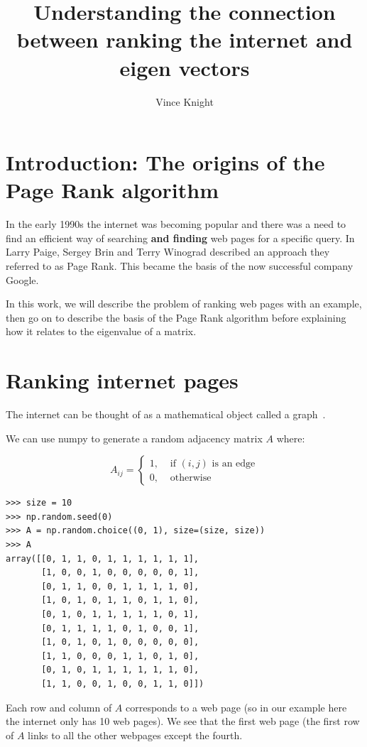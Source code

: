 \documentclass[a4paper]{article}
\title{Understanding the connection between
       ranking the internet and eigen vectors}
\author{Vince Knight}
\date{}
\begin{document}
\maketitle

\section{Introduction: The origins of the Page Rank algorithm}

In the early 1990s the internet was becoming popular and there was a need to
find an efficient way of searching \textbf{and finding} web pages for a specific
query. In~\cite{page1999pagerank} Larry Paige, Sergey Brin and Terry Winograd
described an approach they referred to as Page Rank. This became the basis of
the now successful company Google.

In this work, we will describe the problem of ranking web pages with an example,
then go on to describe the basis of the Page Rank algorithm before explaining
how it relates to the eigenvalue of a matrix.

\section{Ranking internet pages}\label{sec:ranking_pages}

The internet can be thought of as a mathematical object called a
graph~\cite{diestel2005graph}.

We can use numpy to generate a random adjacency matrix \(A\) where:

\[
    A_{ij}
    =
    \begin{cases}
        1,&\text{ if }(i,j) \text{ is an edge}\\
        0,&\text{ otherwise}
    \end{cases}
\]

\begin{verbatim}
>>> size = 10
>>> np.random.seed(0)
>>> A = np.random.choice((0, 1), size=(size, size))
>>> A
array([[0, 1, 1, 0, 1, 1, 1, 1, 1, 1],
       [1, 0, 0, 1, 0, 0, 0, 0, 0, 1],
       [0, 1, 1, 0, 0, 1, 1, 1, 1, 0],
       [1, 0, 1, 0, 1, 1, 0, 1, 1, 0],
       [0, 1, 0, 1, 1, 1, 1, 1, 0, 1],
       [0, 1, 1, 1, 1, 0, 1, 0, 0, 1],
       [1, 0, 1, 0, 1, 0, 0, 0, 0, 0],
       [1, 1, 0, 0, 0, 1, 1, 0, 1, 0],
       [0, 1, 0, 1, 1, 1, 1, 1, 1, 0],
       [1, 1, 0, 0, 1, 0, 0, 1, 1, 0]])
\end{verbatim}

Each row and column of \(A\) corresponds to a web page (so in our example here
the internet only has 10 web pages). We see that the first web page (the first
row of \(A\) links to all the other webpages except the fourth.
\end{document}
